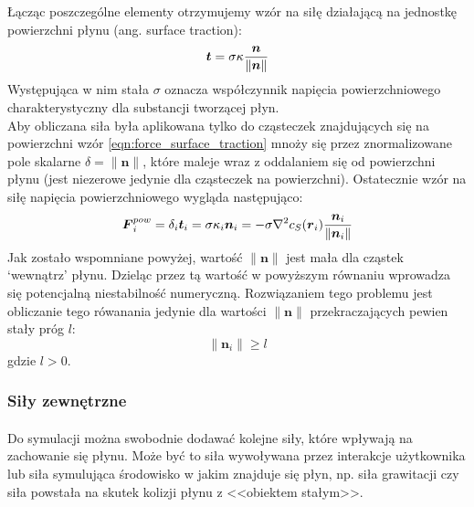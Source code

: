Łącząc poszczególne elementy otrzymujemy wzór na siłę działającą na jednostkę powierzchni płynu (ang. surface traction):
\begin{equation}
\boldsymbol{t} = \sigma \kappa {\boldsymbol{n} \over \|\boldsymbol{n}\|}
\label{eqn:force_surface_traction}
\end{equation}
Występująca w nim stała $\sigma$ oznacza współczynnik napięcia powierzchniowego charakterystyczny dla substancji tworzącej płyn.\\
Aby obliczana siła była aplikowana tylko do cząsteczek znajdujących się na powierzchni wzór \eqref{eqn:force_surface_traction} mnoży się przez znormalizowane pole skalarne $\delta = \|\boldsymbol{n}\|$, które maleje wraz z oddalaniem się od powierzchni płynu (jest niezerowe jedynie dla cząsteczek na powierzchni). Ostatecznie wzór na siłę napięcia powierzchniowego wygląda następująco:
\begin{equation}
\boldsymbol{F}_i^{pow} = \delta_i \boldsymbol{t}_i = \sigma \kappa_i \boldsymbol{n}_i = - \sigma \nabla^2{c}_S(\boldsymbol{r}_i) {\boldsymbol{n}_i \over \|\boldsymbol{n}_i\|}
\label{eqn:sph_force_surface_tension}
\end{equation}
Jak zostało wspomniane powyżej, wartość $\|\boldsymbol{n}\|$ jest mała dla cząstek `wewnątrz' płynu. Dzieląc przez tą wartość w powyższym równaniu wprowadza się potencjalną niestabilność numeryczną. Rozwiązaniem tego problemu jest obliczanie tego rówanania jedynie dla wartości $\|\boldsymbol{n}\|$ przekraczających pewien stały próg $l$:
\begin{equation}
\|\boldsymbol{n}_i\| \geq l
\label{eqn:sph_force_surface_tension_threshold}
\end{equation}
gdzie $l > 0$.\\
\par

\subsubsection{Siły zewnętrzne}

\paragraph{}
Do symulacji można swobodnie dodawać kolejne siły, które wpływają na zachowanie się płynu. Może być to siła wywoływana przez interakcje użytkownika lub siła symulująca środowisko w jakim znajduje się płyn, np. siła grawitacji czy siła powstała na skutek kolizji płynu z <<obiektem stałym>>.
\par


